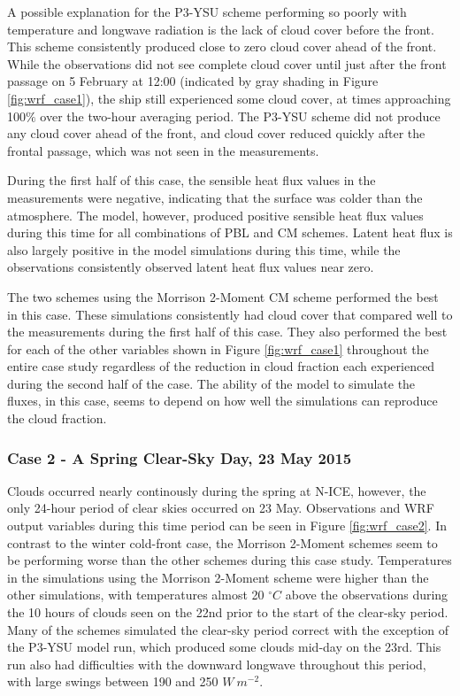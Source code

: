 A possible explanation for the P3-YSU scheme performing so poorly with temperature and longwave radiation is the lack of cloud cover before the front. This scheme consistently produced close to zero cloud cover ahead of the front. While the observations did not see complete cloud cover until just after the front passage on 5 February at 12:00 (indicated by gray shading in Figure \ref{fig:wrf_case1}), the ship still experienced some cloud cover, at times approaching 100$\%$ over the two-hour averaging period. The P3-YSU scheme did not produce any cloud cover ahead of the front, and cloud cover reduced quickly after the frontal passage, which was not seen in the measurements. 

During the first half of this case, the sensible heat flux values in the measurements were negative, indicating that the surface was colder than the atmosphere. The model, however, produced positive sensible heat flux values during this time for all combinations of PBL and CM schemes. Latent heat flux is also largely positive in the model simulations during this time, while the observations consistently observed latent heat flux values near zero. 

The two schemes using the Morrison 2-Moment CM scheme performed the best in this case. These simulations consistently had cloud cover that compared well to the measurements during the first half of this case. They also performed the best for each of the other variables shown in Figure \ref{fig:wrf_case1} throughout the entire case study regardless of the reduction in cloud fraction each experienced during the second half of the case. The ability of the model to simulate the fluxes, in this case, seems to depend on how well the simulations can reproduce the cloud fraction.

\subsubsection{Case 2 - A Spring Clear-Sky Day, 23 May 2015}

Clouds occurred nearly continously during the spring at N-ICE, however, the only 24-hour period of clear skies occurred on 23 May. Observations and WRF output variables during this time period can be seen in Figure \ref{fig:wrf_case2}. In contrast to the winter cold-front case, the Morrison 2-Moment schemes seem to be performing worse than the other schemes during this case study. Temperatures in the simulations using the Morrison 2-Moment scheme were higher than the other simulations, with temperatures almost 20 $^{\circ} C$ above the observations during the 10 hours of clouds seen on the 22nd prior to the start of the clear-sky period. Many of the schemes simulated the clear-sky period correct with the exception of the P3-YSU model run, which produced some clouds mid-day on the 23rd. This run also had difficulties with the downward longwave throughout this period, with large swings between 190 and 250 $W~m^{-2}$. 

